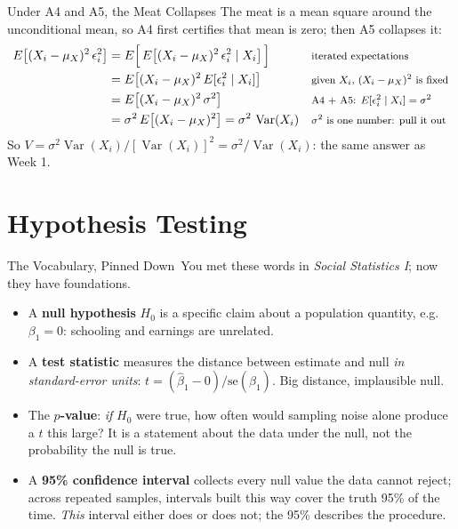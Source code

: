 \documentclass[aspectratio=169,11pt,xcolor=dvipsnames]{beamer}
\DeclareMathOperator{\Var}{Var}
\newcommand{\E}{E}
\newcommand{\core}{\,\raisebox{0.6pt}{\textcolor{corestar}{$\bigstar$}}}
\begin{document}
\begin{frame}{Under A4 and A5, the Meat Collapses}
The meat is a mean square around the unconditional mean, so A4 first
certifies that mean is zero; then A5 collapses it:
\begin{align*}
  \E\big[(X_i-\mu_X)^2\,\epsilon_i^2\big]
  &= \E\Big[\,\E\big[(X_i-\mu_X)^2\,\epsilon_i^2 \mid X_i\big]\,\Big]
    && \text{\footnotesize iterated expectations} \\
  &= \E\big[(X_i-\mu_X)^2\,\E[\epsilon_i^2 \mid X_i]\big]
    && \text{\footnotesize given $X_i$, $(X_i-\mu_X)^2$ is fixed} \\
  &= \E\big[(X_i-\mu_X)^2\,\sigma^2\big]
    && \text{\footnotesize A4 + A5: $\E[\epsilon_i^2 \mid X_i] = \sigma^2$} \\
  &= \sigma^2\,\E\big[(X_i-\mu_X)^2\big] = \sigma^2\,\Var(X_i)
    && \text{\footnotesize $\sigma^2$ is one number: pull it out}
\end{align*}
So $V = \sigma^2\Var(X_i)\big/[\Var(X_i)]^2 = \sigma^2/\Var(X_i)$: the same
answer as Week 1.
\end{frame}

\section[Testing]{Hypothesis Testing}
\begin{frame}\sectionpage\end{frame}

\begin{frame}{The Vocabulary, Pinned Down\core}
You met these words in \textit{Social Statistics I}; now they have foundations.
\begin{itemize}\itemsep3pt
  \item A \textbf{null hypothesis} $H_0$ is a specific claim about a population
        quantity, e.g.\ $\beta_1 = 0$: schooling and earnings are unrelated.
  \item A \textbf{test statistic} measures the distance between estimate and
        null \emph{in standard-error units}: $t = (\hat\beta_1 - 0)/
        \mathrm{se}(\hat\beta_1)$. Big distance, implausible null.
  \item The \textbf{$p$-value}: \emph{if} $H_0$ were true, how often would
        sampling noise alone produce a $t$ this large? It is a statement about
        the data under the null, \alert{not} the probability the null is true.
  \item A \textbf{95\% confidence interval} collects every null value the data
        cannot reject; across repeated samples, intervals built this way cover
        the truth 95\% of the time. \emph{This} interval either does or does
        not; the 95\% describes the procedure.
\end{itemize}
\end{frame}
\end{document}
